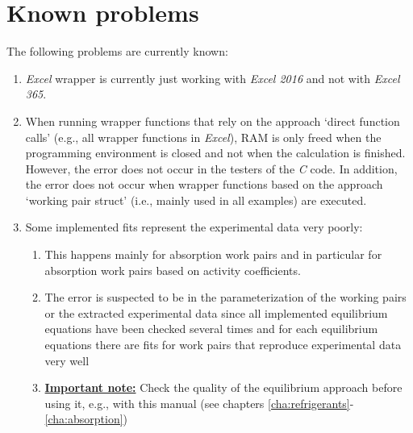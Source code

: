 \section{Known problems}
\label{cha:usage:problems}
%
The following problems are currently known:
\begin{enumerate}
	\item \textit{Excel} wrapper is currently just working with \textit{Excel 2016} and not with \textit{Excel 365}.
	\item When running wrapper functions that rely on the approach ‘direct function calls’ (e.g., all wrapper functions in \textit{Excel}), RAM is only freed when the programming environment is closed and not when the calculation is finished. However, the error does not occur in the testers of the \textit{C} code. In addition, the error does not occur when wrapper functions based on the approach ‘working pair struct’ (i.e., mainly used in all examples) are executed.
	\item Some implemented fits represent the experimental data very poorly:
	\begin{enumerate}
		\item This happens mainly for absorption work pairs and in particular for absorption work pairs based on activity coefficients.
		\item The error is suspected to be in the parameterization of the working pairs or the extracted experimental data since all implemented equilibrium equations have been checked several times and for each equilibrium equations there are fits for work pairs that reproduce experimental data very well
		\item \textbf{\underline{Important note:}} Check the quality of the equilibrium approach before using it, e.g., with this manual (see chapters \ref{cha:refrigerants}-\ref{cha:absorption})
	\end{enumerate}
\end{enumerate}
